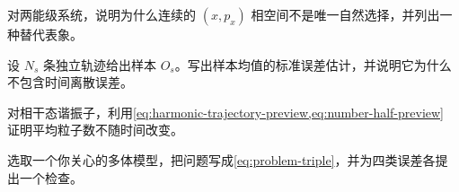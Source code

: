 \begin{exercises}
  \item 对两能级系统，说明为什么连续的 $(x,p_x)$ 相空间不是唯一自然选择，并列出一种替代表象。
  \item 设 $N_s$ 条独立轨迹给出样本 $O_s$。写出样本均值的标准误差估计，并说明它为什么不包含时间离散误差。
  \item 对相干态谐振子，利用\cref{eq:harmonic-trajectory-preview,eq:number-half-preview} 证明平均粒子数不随时间改变。
  \item 选取一个你关心的多体模型，把问题写成\cref{eq:problem-triple}，并为四类误差各提出一个检查。
\end{exercises}
